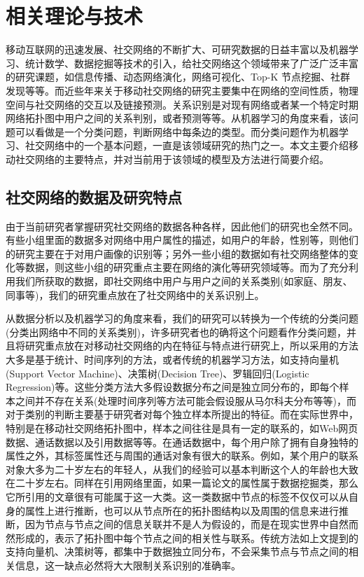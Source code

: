 \chapter{相关理论与技术}
移动互联网的迅速发展、社交网络的不断扩大、可研究数据的日益丰富以及机器学习、统计数学、数据挖掘等技术的引入，给社交网络这个领域带来了广泛广泛丰富的研究课题，如信息传播、动态网络演化，网络可视化、Top-K 节点挖掘、社群发现等等。而近些年来关于移动社交网络的研究主要集中在网络的空间性质，物理空间与社交网络的交互以及链接预测。关系识别是对现有网络或者某一个特定时期网络拓扑图中用户之间的关系判别，或者预测等等。从机器学习的角度来看，该问题可以看做是一个分类问题，判断网络中每条边的类型。而分类问题作为机器学习、社交网络中的一个基本问题，一直是该领域研究的热门之一。本文主要介绍移动社交网络的主要特点，并对当前用于该领域的模型及方法进行简要介绍。

\section{社交网络的数据及研究特点}

由于当前研究者掌握研究社交网络的数据各种各样，因此他们的研究也全然不同。有些小组里面的数据多对网络中用户属性的描述，如用户的年龄，性别等，则他们的研究主要在于对用户画像的识别等；另外一些小组的数据如有社交网络整体的变化等数据，则这些小组的研究重点主要在网络的演化等研究领域等。而为了充分利用我们所获取的数据，即社交网络中用户与用户之间的关系类别(如家庭、朋友、同事等)，我们的研究重点放在了社交网络中的关系识别上。

从数据分析以及机器学习的角度来看，我们的研究可以转换为一个传统的分类问题(分类出网络中不同的关系类别)，许多研究者也的确将这个问题看作分类问题，并且将研究重点放在对移动社交网络的内在特征与特点进行研究上，所以采用的方法大多是基于统计、时间序列的方法，或者传统的机器学习方法，如支持向量机(Support Vector Machine)、决策树(Decision Tree)、罗辑回归(Logistic Regression)等。这些分类方法大多假设数据分布之间是独立同分布的，即每个样本之间并不存在关系(处理时间序列等方法可能会假设服从马尔科夫分布等等)，而对于类别的判断主要基于研究者对每个独立样本所提出的特征。而在实际世界中，特别是在移动社交网络拓扑图中，样本之间往往是具有一定的联系的，如Web网页数据、通话数据以及引用数据等等。在通话数据中，每个用户除了拥有自身独特的属性之外，其标签属性还与周围的通话对象有很大的联系。例如，某个用户的联系对象大多为二十岁左右的年轻人，从我们的经验可以基本判断这个人的年龄也大致在二十岁左右。同样在引用网络里面，如果一篇论文的属性属于数据挖掘类，那么它所引用的文章很有可能属于这一大类。这一类数据中节点的标签不仅仅可以从自身的属性上进行推断，也可以从节点所在的拓扑图结构以及周围的信息来进行推断，因为节点与节点之间的信息关联并不是人为假设的，而是在现实世界中自然而然形成的，表示了拓扑图中每个节点之间的相关性与联系。传统方法如上文提到的支持向量机、决策树等，都集中于数据独立同分布，不会采集节点与节点之间的相关信息，这一缺点必然将大大限制关系识别的准确率。

